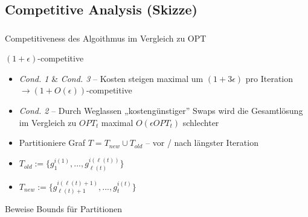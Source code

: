 \subsection{Competitive Analysis (Skizze)}
\begin{frame}
    \frametitle{\insertsubsection}
    Competitiveness des Algoithmus im Vergleich zu OPT\\
    \vspace{.5em}
    \begin{block}{$(1+\epsilon)$-competitive}
        \vspace{.5em}
        \begin{itemize}
            \itemsep\setlength{.5em}
            \item \emph{Cond. 1} \& \emph{Cond. 3} -- Kosten steigen maximal um $(1+3\epsilon)$ pro Iteration $\rightarrow (1+O(\epsilon))$-competitive
            \item \emph{Cond. 2} -- Durch Weglassen „kostengünstiger” Swaps wird die Gesamtlösung im Vergleich zu $OPT_t$ maximal $O(\epsilon OPT_t)$ schlechter
        \end{itemize}
        \vspace{.1em}
    \end{block}
    \begin{itemize}
        \itemsep\setlength{.5em}
        \item Partitioniere Graf $T = T_{new} \cup T_{old}$ -- vor / nach längster Iteration
        \item $T_{old} := \{g_1^{i(1)}, ..., g_{\ell(t)}^{i(\ell(t))}\}$
        \item $T_{new} := \{g_{\ell(t)+1}^{i(\ell(t)+1)}, ..., g_t^{i(t)}\}$
    \end{itemize}
    Beweise Bounds für Partitionen
\end{frame}

